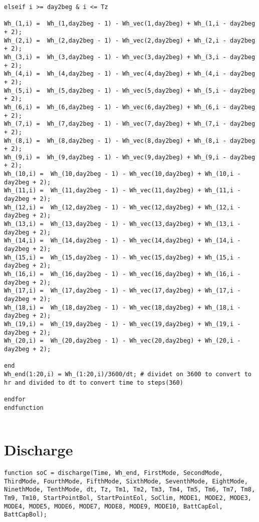 \begin{appendix}
\begin{lstlisting}
elseif i >= day2beg & i <= Tz

Wh_(1,i) =  Wh_(1,day2beg - 1) - Wh_vec(1,day2beg) + Wh_(1,i - day2beg + 2);
Wh_(2,i) =  Wh_(2,day2beg - 1) - Wh_vec(2,day2beg) + Wh_(2,i - day2beg + 2);
Wh_(3,i) =  Wh_(3,day2beg - 1) - Wh_vec(3,day2beg) + Wh_(3,i - day2beg + 2);
Wh_(4,i) =  Wh_(4,day2beg - 1) - Wh_vec(4,day2beg) + Wh_(4,i - day2beg + 2);
Wh_(5,i) =  Wh_(5,day2beg - 1) - Wh_vec(5,day2beg) + Wh_(5,i - day2beg + 2);
Wh_(6,i) =  Wh_(6,day2beg - 1) - Wh_vec(6,day2beg) + Wh_(6,i - day2beg + 2);
Wh_(7,i) =  Wh_(7,day2beg - 1) - Wh_vec(7,day2beg) + Wh_(7,i - day2beg + 2);
Wh_(8,i) =  Wh_(8,day2beg - 1) - Wh_vec(8,day2beg) + Wh_(8,i - day2beg + 2);
Wh_(9,i) =  Wh_(9,day2beg - 1) - Wh_vec(9,day2beg) + Wh_(9,i - day2beg + 2);
Wh_(10,i) =  Wh_(10,day2beg - 1) - Wh_vec(10,day2beg) + Wh_(10,i - day2beg + 2);
Wh_(11,i) =  Wh_(11,day2beg - 1) - Wh_vec(11,day2beg) + Wh_(11,i - day2beg + 2);
Wh_(12,i) =  Wh_(12,day2beg - 1) - Wh_vec(12,day2beg) + Wh_(12,i - day2beg + 2);
Wh_(13,i) =  Wh_(13,day2beg - 1) - Wh_vec(13,day2beg) + Wh_(13,i - day2beg + 2);
Wh_(14,i) =  Wh_(14,day2beg - 1) - Wh_vec(14,day2beg) + Wh_(14,i - day2beg + 2);
Wh_(15,i) =  Wh_(15,day2beg - 1) - Wh_vec(15,day2beg) + Wh_(15,i - day2beg + 2);
Wh_(16,i) =  Wh_(16,day2beg - 1) - Wh_vec(16,day2beg) + Wh_(16,i - day2beg + 2);
Wh_(17,i) =  Wh_(17,day2beg - 1) - Wh_vec(17,day2beg) + Wh_(17,i - day2beg + 2);
Wh_(18,i) =  Wh_(18,day2beg - 1) - Wh_vec(18,day2beg) + Wh_(18,i - day2beg + 2);
Wh_(19,i) =  Wh_(19,day2beg - 1) - Wh_vec(19,day2beg) + Wh_(19,i - day2beg + 2);
Wh_(20,i) =  Wh_(20,day2beg - 1) - Wh_vec(20,day2beg) + Wh_(20,i - day2beg + 2);

end     
Wh_end(1:20,i) = Wh_(1:20,i)/3600/dt; # dividet on 3600 to convert to hr and divided to dt to convert time to steps(360)

endfor
endfunction
   
\end{lstlisting}
\newpage
\section{Discharge}
\begin{lstlisting}
function soC = discharge(Time, Wh_end, FirstMode, SecondMode, ThirdMode, FourthMode, FifthMode, SixthMode, SeventhMode, EightMode, NinethMode, TenthMode, dt, Tz, Tm1, Tm2, Tm3, Tm4, Tm5, Tm6, Tm7, Tm8, Tm9, Tm10, StartPointBol, StartPointEol, SoClim, MODE1, MODE2, MODE3, MODE4, MODE5, MODE6, MODE7, MODE8, MODE9, MODE10, BattCapEol, BattCapBol);


\end{lstlisting}
\end{appendix}
